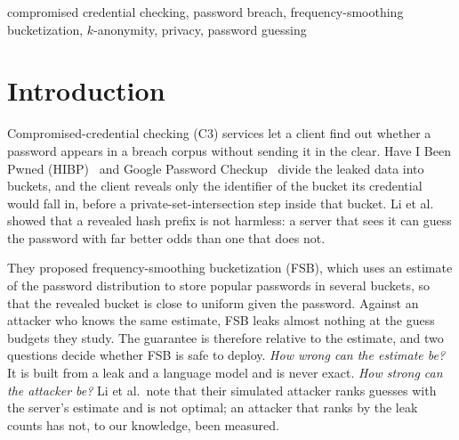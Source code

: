 \begin{abstract}
Frequency-smoothing bucketization (FSB) lets a compromised-credential-checking server hide which leaked password a client asks about, but its guarantee holds only relative to the server's own estimate of the password distribution. We measure by simulation on the RockYou leak (13.1M stored passwords, held-out accounts as targets) how far that guarantee carries when the estimate is noisy and the attacker holds the leak. Against the estimate-based attacker of Li et al., FSB's loss over the no-bucket baseline is 0.0 percentage points (pp) at $q=\qbar=100$ guesses, against 41.1 pp for size-matched hash-prefix bucketization (HPB), and it tolerates multiplicative noise of about $\sigma=0.7$ on the estimate. A count-aware attacker is stronger: FSB then loses 10.5 to 10.9 pp at $q=\qbar$, still about 73\% below HPB. The loss comes from rare stored passwords that the estimate underrates. A floor on the number of buckets per password removes most of it for $q\le\qbar$ (0.08 pp at $\qbar=100$ for 1.56 times the bucket size) but not beyond $\qbar$, and the results are stable over four splits of the leak.
\end{abstract}

\begin{IEEEkeywords}
compromised credential checking, password breach, frequency-smoothing bucketization, $k$-anonymity, privacy, password guessing
\end{IEEEkeywords}

\section{Introduction}

Compromised-credential checking (C3) services let a client find out whether a password appears in a breach corpus without sending it in the clear. Have I Been Pwned (HIBP)~\cite{hunt} and Google Password Checkup~\cite{thomas2019} divide the leaked data into buckets, and the client reveals only the identifier of the bucket its credential would fall in, before a private-set-intersection step inside that bucket. Li et al.~\cite{li2019} showed that a revealed hash prefix is not harmless: a server that sees it can guess the password with far better odds than one that does not.

They proposed frequency-smoothing bucketization (FSB), which uses an estimate of the password distribution to store popular passwords in several buckets, so that the revealed bucket is close to uniform given the password. Against an attacker who knows the same estimate, FSB leaks almost nothing at the guess budgets they study. The guarantee is therefore relative to the estimate, and two questions decide whether FSB is safe to deploy. \emph{How wrong can the estimate be?} It is built from a leak and a language model and is never exact. \emph{How strong can the attacker be?} Li et al.\ note that their simulated attacker ranks guesses with the server's estimate and is not optimal; an attacker that ranks by the leak counts has not, to our knowledge, been measured.

